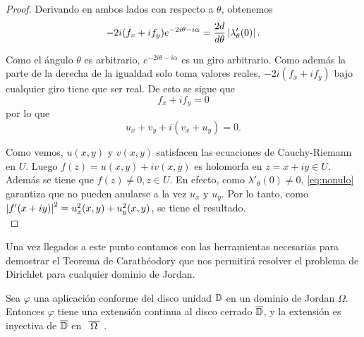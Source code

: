 \begin{proof}
    Derivando en ambos lados con respecto a $\theta$, obtenemos
    \begin{equation*}
        -2i (f_x + i f_y) e^{-2i \theta - i \alpha} = \frac{2d}{d \theta} \left\lvert\lambda_{\theta}'(0)\right\rvert.
    \end{equation*}


    Como el ángulo $\theta$ es arbitrario, $e^{-2i \theta - i \alpha}$ es un giro arbitrario. Como además la parte de la derecha de la igualdad solo toma valores reales, $-2i(f_x + i f_y)$ bajo cualquier giro tiene que ser real. De esto se sigue que
       \begin{equation*}
        f_x + i f_y = 0
    \end{equation*}
    por lo que
    \begin{equation*}
        u_x + v_y + i(v_x + u_y) = 0.
    \end{equation*}

    Como vemos, $u(x,y)$ y $v(x,y)$ satisfacen las ecuaciones de Cauchy-Riemann en $U$. Luego $f(z) = u(x,y) + i v(x,y)$ es holomorfa en $z = x + iy \in U$. Además se tiene que $f(z) \not = 0, z \in U$. En efecto, como $\lambda'_\theta(0) \neq 0$, \eqref{eq:nonulo} garantiza que no pueden anularse a la vez $u_x$ y $u_y$. Por lo tanto, como $\left\lvert f'(x+iy)\right\rvert^2 = u_x^2(x,y)+u_y^2(x,y)$, se tiene el resultado. \\
\end{proof}

Una vez llegados a este punto contamos con las herramientas necesarias para demostrar el Teorema de Carathéodory que nos permitirá resolver el problema de Dirichlet para cualquier dominio de Jordan. \\

\begin{theorem}
    \label{th:caratheodory}
    Sea $\varphi$ una aplicación conforme del disco unidad $\mathbb{D}$ en un dominio de Jordan $\Omega$. Entonces $\varphi$ tiene una extensión continua al disco cerrado $\overline{\mathbb{D}}$, y la extensión es inyectiva de $\overline{\mathbb{D}}$ en $\xbar{\Omega}$.
\end{theorem}


